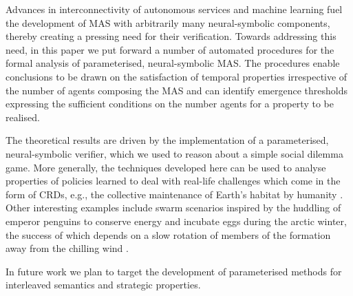 Advances in interconnectivity of autonomous services and machine learning fuel
the development of MAS with arbitrarily many neural-symbolic components,
thereby creating a pressing need for their verification. Towards addressing
this need, in this paper we put forward a number of automated procedures for
the formal analysis of parameterised, neural-symbolic MAS. The procedures
enable conclusions to be drawn on the satisfaction of temporal properties
irrespective of the number of agents composing the MAS and can identify
emergence thresholds expressing the sufficient conditions on the number agents
for a property to be realised.

The theoretical results are driven by the implementation of a parameterised,
neural-symbolic verifier, which we used to reason about a simple social dilemma
game. More generally, the techniques developed here can be used to analyse
properties of policies learned to deal with real-life challenges which come in
the form of CRDs, e.g., the collective maintenance of Earth's habitat by
humanity \cite{Smirnov19}.
Other interesting examples include swarm scenarios inspired by the huddling of
emperor penguins to conserve energy and incubate eggs
\cite{LeMaho1977,GilbertRLNA06} during the arctic winter, the success of which
depends on a slow rotation of members of the formation away from the chilling
wind \cite{WatersBK12}.

In future work we plan to target the development of parameterised methods for
interleaved semantics and strategic properties.

